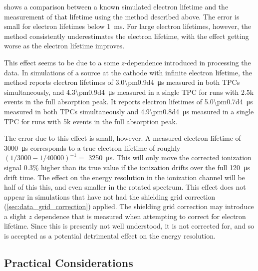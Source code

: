 \documentclass[herrin-thesis.tex]{subfiles}
\begin{document}
 shows a comparison between a known simulated electron lifetime and the measurement of that lifetime using the method described above. The error is small for electron lifetimes below \SI{1}{\ms}. For large electron lifetimes, however, the method consistently underestimates the electron lifetime, with the effect getting worse as the electron lifetime improves. 

This effect seems to be due to a some \(z\)-dependence introduced in processing the data. In simulations of a  source at the cathode with infinite electron lifetime, the method reports electron lifetimes of \SI{3.0\pm0.9d4}{\micro\second} measured in both TPCs simultaneously, and \SI{4.3\pm0.9d4}{\micro\second} measured in a single TPC for runs with 2.5k events in the full absorption peak. It reports electron lifetimes of \SI{5.0\pm0.7d4}{\micro\second} measured in both TPCs simultaneously and \SI{4.9\pm0.8d4}{\micro\second} measured in a single TPC for runs with 5k events in the full absorption peak.

The error due to this effect is small, however. A measured electron lifetime of \SI{3000}{\micro\second} corresponds to a true electron lifetime of roughly \((1/3000-1/40000)^{-1} =\) \SI{3250}{\micro\second}. This will only move the corrected ionization signal 0.3\% higher than its true value if the ionization drifts over the full \SI{120}{\micro\second} drift time. The effect on the energy resolution in the ionization channel will be half of this this, and even smaller in the rotated spectrum. This effect does not appear in simulations that have not had the shielding grid correction (\cref{sec:data_grid_correction}) applied. The shielding grid correction may introduce a slight \(z\) dependence that is measured when attempting to correct for electron lifetime. Since this is presently not well understood, it is not corrected for, and so is accepted as a potential detrimental effect on the energy resolution.

\subsection{Practical Considerations}
\label{sec:el_practical_considerations}
\end{document}
